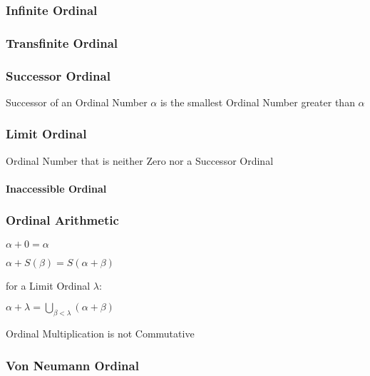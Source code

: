 \subsubsection{Infinite Ordinal}\label{sec:infinite_ordinal}

\subsubsection{Transfinite Ordinal}\label{sec:transfinite_ordinal}

\subsubsection{Successor Ordinal}\label{sec:successor_ordinal}

Successor of an Ordinal Number $\alpha$ is the smallest Ordinal Number
greater than $\alpha$



\subsubsection{Limit Ordinal}\label{sec:limit_ordinal}

Ordinal Number that is neither Zero nor a Successor Ordinal



\paragraph{Inaccessible Ordinal}\label{sec:inaccessible_ordinal}\hfill



\subsubsection{Ordinal Arithmetic}\label{sec:ordinal_arithmetic}

$\alpha + 0 = \alpha$

$\alpha + S(\beta) = S(\alpha + \beta)$

for a Limit Ordinal $\lambda$:

$\alpha + \lambda = \bigcup_{\beta < \lambda} (\alpha + \beta)$

Ordinal Multiplication is not Commutative



\subsubsection{Von Neumann Ordinal}\label{sec:vonneumann_ordinal}

